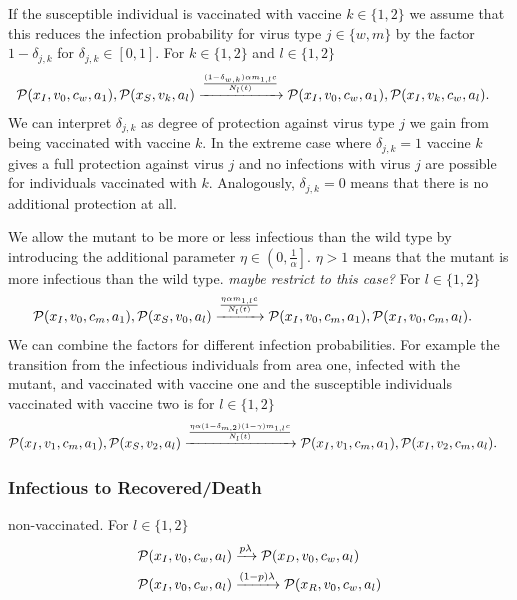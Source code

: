 If the susceptible individual is vaccinated with vaccine $k \in \{1,2\}$ we assume that this reduces the infection probability for virus type $j \in \{w,m\}$ by the factor $1 - \delta_{j,k}$ for $\delta_{j,k} \in [0,1]$. For $k \in \{1,2 \}$ and $l \in \{1,2\}$
\begin{align*}
\mathcal{P}(x_{I},  v_0, c_w, a_1), \mathcal{P}(x_{S}, v_k, a_l) &\xrightarrow{\frac{(1-\delta_{w,k}) \alpha  m_{1,l} c}{N_l(t)}} \mathcal{P}(x_{I},  v_0, c_w, a_1), \mathcal{P}(x_{I},  v_k, c_w, a_l).
\end{align*}
We can interpret $\delta_{j,k}$ as degree of protection against virus type $j$ we gain from being vaccinated with vaccine $k$. In the extreme case where $\delta_{j,k} = 1$ vaccine $k$ gives a full protection against virus $j$ and no infections with virus $j$ are possible for individuals vaccinated with $k$. Analogously, $\delta_{j,k} = 0$ means that there is no additional protection at all.

We allow the mutant to be more or less infectious than the wild type by introducing the additional parameter $\eta \in \left(0, \frac{1}{\alpha}\right]$. $\eta > 1$ means that the mutant is more infectious than the wild type. \textit{maybe restrict to this case?} 
For $l \in \{1,2\}$
\begin{align*}
\mathcal{P}(x_{I},  v_0, c_m, a_1), \mathcal{P}(x_{S}, v_0, a_l) &\xrightarrow{\frac{ \eta \alpha  m_{1,l} c}{N_l(t)}} \mathcal{P}(x_{I},  v_0, c_m, a_1), \mathcal{P}(x_{I},  v_0, c_m, a_l).
\end{align*}
We can combine the factors for different infection probabilities. For example the transition from the infectious individuals from area one, infected with the mutant, and vaccinated with vaccine one and the susceptible individuals vaccinated with vaccine two is for $l \in \{1,2\}$
\begin{align*}
\mathcal{P}(x_{I},  v_1, c_m, a_1), \mathcal{P}(x_{S}, v_2, a_l) &\xrightarrow{\frac{ \eta \alpha (1-\delta_{m,2}) (1-\gamma)  m_{1,l} c}{N_l(t)}} \mathcal{P}(x_{I},  v_1, c_m, a_1), \mathcal{P}(x_{I},  v_2, c_m, a_l).
\end{align*}

\subsubsection*{Infectious to Recovered/Death}
non-vaccinated. For $l \in \{1,2\}$
\begin{align}
    \mathcal{P}(x_I,  v_0, c_w, a_l) &\xrightarrow{p \lambda} \mathcal{P}(x_D,  v_0, c_w, a_l) \notag \\
\mathcal{P}(x_I,  v_0, c_w, a_l) &\xrightarrow{(1-p) \lambda} \mathcal{P}(x_R,  v_0, c_w, a_l) \notag \\
\end{align}


